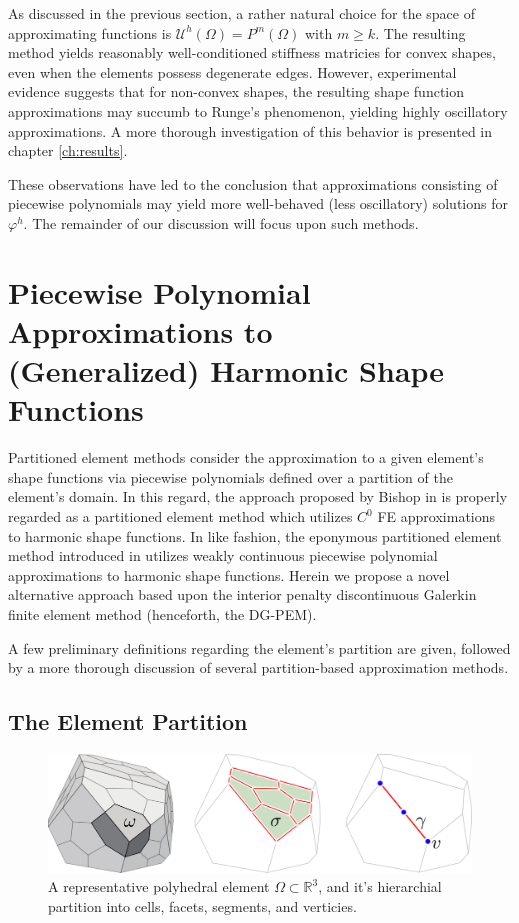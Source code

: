 	As discussed in the previous section, a rather natural choice for the space of approximating functions is $\mathcal{U}^h (\Omega) = P^{m} (\Omega)$ with $m \geq k$. The resulting method yields reasonably well-conditioned stiffness matricies for convex shapes, even when the elements possess degenerate edges. However, experimental evidence suggests that for non-convex shapes, the resulting shape function approximations may succumb to Runge's phenomenon, yielding highly oscillatory approximations. A more thorough investigation of this behavior is presented in chapter \ref{ch:results}.
	
	These observations have led to the conclusion that approximations consisting of piecewise polynomials may yield more well-behaved (less oscillatory) solutions for $\varphi^h$. The remainder of our discussion will focus upon such methods.
	
\section{Piecewise Polynomial Approximations to \\ (Generalized) Harmonic Shape Functions}

Partitioned element methods consider the approximation to a given element's shape functions via piecewise polynomials defined over a partition of the element's domain. In this regard, the approach proposed by Bishop in \cite{Bishop:14} is properly regarded as a partitioned element method which utilizes $C^0$ FE approximations to harmonic shape functions. In like fashion, the eponymous partitioned element method introduced in \cite{Rashid:12} utilizes weakly continuous piecewise polynomial approximations to harmonic shape functions. Herein we propose a novel alternative approach based upon the interior penalty discontinuous Galerkin finite element method (henceforth, the DG-PEM).

A few preliminary definitions regarding the element's partition are given, followed by a more thorough discussion of several partition-based approximation methods.

\subsection*{The Element Partition}

\begin{figure} [!ht]
	\centering
	\includegraphics[width = 6.0in]{figures/polyhedron_partition.pdf}
	\caption{A representative polyhedral element $\Omega \subset \mathbb{R}^3$, and it's hierarchial partition into cells, facets, segments, and verticies.}
	\label{fig:partitioned_element}
\end{figure}

